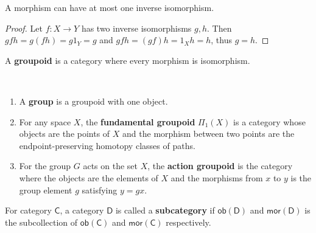 \begin{lemma} A morphism can have at most one inverse isomorphism.
\end{lemma}
\begin{proof} Let $f:X\rightarrow Y$ has two inverse isomorphisms $g,h$. Then $gfh=g(fh)=g1_Y=g$ and $gfh=(gf)h=1_X h=h$, thus $g=h$.
\end{proof}

\begin{defn} A \textbf{groupoid} is a category where every morphism is isomorphism.
\end{defn}

\begin{exmp}
~\begin{enumerate}
\item A \textbf{group} is a groupoid with one object.
\item For any space $X$, the \textbf{fundamental groupoid} $\Pi_1(X)$ is a category whose objects are the points of $X$ and the morphism between two points are the endpoint-preserving homotopy classes of paths.
\item For the group $G$ acts on the set $X$, the \textbf{action groupoid} is the category where the objects are the elements of $X$ and the morphisms from $x$ to $y$ is the group element $g$ satisfying $y=gx$.
\end{enumerate}
\end{exmp}

\begin{defn} For category $\mathsf{C}$, a category $\mathsf{D}$ is called a \textbf{subcategory} if $\mathsf{ob}(\mathsf{D})$ and $\mathsf{mor}(\mathsf{D})$ is the subcollection of $\mathsf{ob}(\mathsf{C})$ and $\mathsf{mor}(\mathsf{C})$ respectively.
\end{defn}

